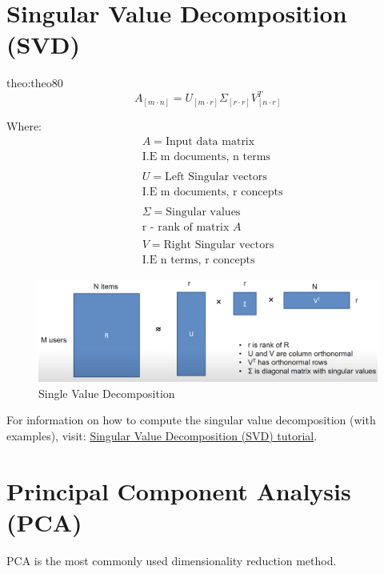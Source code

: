 \section{Singular Value Decomposition (SVD)}
\begin{theo}[SVD]{theo:theo80}
\label{eq:SVD}
\[
A_{[m \cdot n]} = U_{[m \cdot r]} \Sigma_{[r \cdot r]} V_{[n \cdot r]}^T
\]
\end{theo}
Where:
\[
    \begin{aligned}
        & A = \text{Input data matrix} \\
        & \text{I.E m documents, n terms}
        \\
        \\
        & U = \text{Left Singular vectors} \\
        & \text{I.E m documents, r concepts}
        \\
        \\
        & \Sigma = \text{Singular values} \\
        & \text{r - rank of matrix } A
        \\
        \\
        & V = \text{Right Singular vectors} \\
        & \text{I.E n terms, r concepts}
    \end{aligned}
\]

\bigskip
\begin{figure}[H]
\centering
\includegraphics[scale=0.5]{figures/svd.png}
\caption{Single Value Decomposition}
\end{figure}

For information on how to compute the singular value decomposition (with examples), visit: 
\href{http://web.mit.edu/course/other/be.400/OldFiles/www/SVD/Singular_Value_Decomposition.htm}{Singular Value Decomposition (SVD) tutorial}.


\section{Principal Component Analysis (PCA)}
PCA is the most commonly used dimensionality reduction method.

